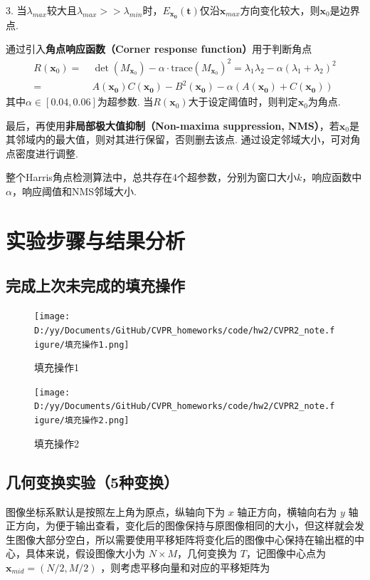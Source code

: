 \documentclass[12pt, a4paper, oneside]{ctexart}
\numberwithin{equation}{section}  %
\def\bd{\boldsymbol}        %
\begin{document}
3. 当$\lambda_{max}$较大且$\lambda_{max}>>\lambda_{min}$时，$E_{\bd{x_0}}(\bd{t})$仅沿$\bd{x}_{max}$方向变化较大，则$\bd{x}_0$是边界点.

通过引入\textbf{角点响应函数（Corner response function）}用于判断角点
\begin{align*}
    R(\bd{x}_0) =&\ \det(M_{\bd{x}_0}) - \alpha\cdot\text{trace}(M_{\bd{x}_0})^2 = \lambda_1\lambda_2 - \alpha(\lambda_1+\lambda_2)^2\\
    =&\ A(\bd{x_0})C(\bd{x_0}) - B^2(\bd{x_0}) - \alpha(A(\bd{x_0})+C(\bd{x_0}))
\end{align*}
其中$\alpha\in[0.04,0.06]$为超参数. 当$R(\bd{x}_0)$大于设定阈值时，则判定$\bd{x}_0$为角点.

最后，再使用\textbf{非局部极大值抑制（Non-maxima suppression, NMS）}，若$\bd{x}_0$是其邻域内的最大值，则对其进行保留，否则删去该点. 通过设定邻域大小，可对角点密度进行调整.

整个Harris角点检测算法中，总共存在4个超参数，分别为窗口大小$k$，响应函数中$\alpha$，响应阈值和NMS邻域大小.

\clearpage
\section{实验步骤与结果分析}
\subsection{完成上次未完成的填充操作}
\begin{figure}[htbp]
    \centering
    \hspace*{-1.5cm}
    \texttt{[image: D:/yy/Documents/GitHub/CVPR\_homeworks/code/hw2/CVPR2\_note.figure/填充操作1.png]}
    \caption{填充操作1}
\end{figure}
\begin{figure}[htbp]
    \centering
    \hspace*{-1.5cm}
    \texttt{[image: D:/yy/Documents/GitHub/CVPR\_homeworks/code/hw2/CVPR2\_note.figure/填充操作2.png]}
    \caption{填充操作2}
\end{figure}
\subsection{几何变换实验（5种变换）}
图像坐标系默认是按照左上角为原点，纵轴向下为 \(x\) 轴正方向，横轴向右为
\(y\)
轴正方向，为便于输出查看，变化后的图像保持与原图像相同的大小，但这样就会发生图像大部分空白，所以需要使用平移矩阵将变化后的图像中心保持在输出框的中心，具体来说，假设图像大小为
\(N\times M\)，几何变换为 \(T\)，记图像中心点为
\(\boldsymbol{x}_{mid} = (N/2,M/2)\) ，则考虑平移向量和对应的平移矩阵为
\end{document}
